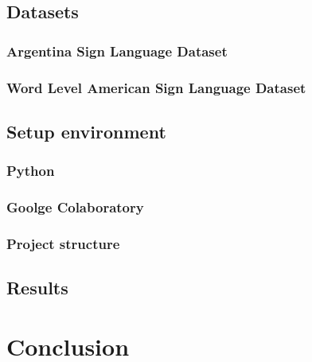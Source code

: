 \documentclass[a4paper, 12pt]{article}
\begin{document}
\subsection{Datasets}
\subsubsection{Argentina Sign Language Dataset}
\subsubsection{Word Level American Sign Language Dataset}
\subsection{Setup environment}
\subsubsection{Python}
\subsubsection{Goolge Colaboratory}
\subsubsection{Project structure}
\subsection{Results}

\section{Conclusion}


\newpage

\newpage


\end{document}

